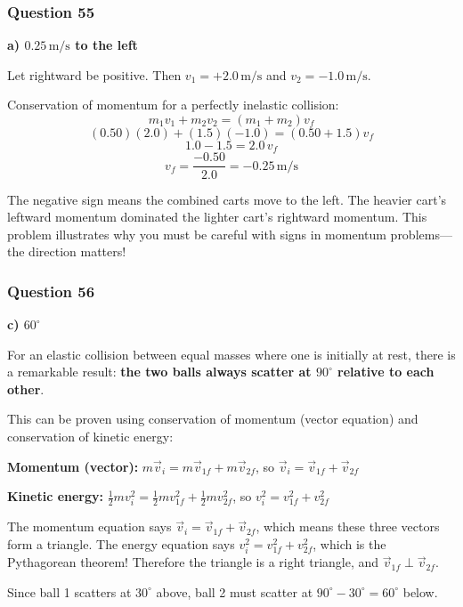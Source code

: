 \documentclass[12pt,letterpaper]{article}
\begin{document}
\subsubsection*{Question 55}

\begin{answerbox}
\textbf{a) $0.25\,\text{m/s}$ to the left}
\end{answerbox}

\begin{explanationbox}
Let rightward be positive. Then $v_1 = +2.0\,\text{m/s}$ and $v_2 = -1.0\,\text{m/s}$.

Conservation of momentum for a perfectly inelastic collision:
\[
m_1 v_1 + m_2 v_2 = (m_1 + m_2)v_f
\]
\[
(0.50)(2.0) + (1.5)(-1.0) = (0.50 + 1.5)v_f
\]
\[
1.0 - 1.5 = 2.0\,v_f
\]
\[
v_f = \frac{-0.50}{2.0} = -0.25\,\text{m/s}
\]

The negative sign means the combined carts move to the left. The heavier cart's leftward momentum dominated the lighter cart's rightward momentum. This problem illustrates why you must be careful with signs in momentum problems---the direction matters!
\end{explanationbox}

\subsubsection*{Question 56}

\begin{answerbox}
\textbf{c) $60^\circ$}
\end{answerbox}

\begin{explanationbox}
For an elastic collision between equal masses where one is initially at rest, there is a remarkable result: \textbf{the two balls always scatter at $90^\circ$ relative to each other}.

This can be proven using conservation of momentum (vector equation) and conservation of kinetic energy:

\textbf{Momentum (vector):} $m\vec{v}_i = m\vec{v}_{1f} + m\vec{v}_{2f}$, so $\vec{v}_i = \vec{v}_{1f} + \vec{v}_{2f}$

\textbf{Kinetic energy:} $\frac{1}{2}mv_i^2 = \frac{1}{2}mv_{1f}^2 + \frac{1}{2}mv_{2f}^2$, so $v_i^2 = v_{1f}^2 + v_{2f}^2$

The momentum equation says $\vec{v}_i = \vec{v}_{1f} + \vec{v}_{2f}$, which means these three vectors form a triangle. The energy equation says $v_i^2 = v_{1f}^2 + v_{2f}^2$, which is the Pythagorean theorem! Therefore the triangle is a right triangle, and $\vec{v}_{1f} \perp \vec{v}_{2f}$.

Since ball 1 scatters at $30^\circ$ above, ball 2 must scatter at $90^\circ - 30^\circ = 60^\circ$ below.
\end{explanationbox}
\end{document}
